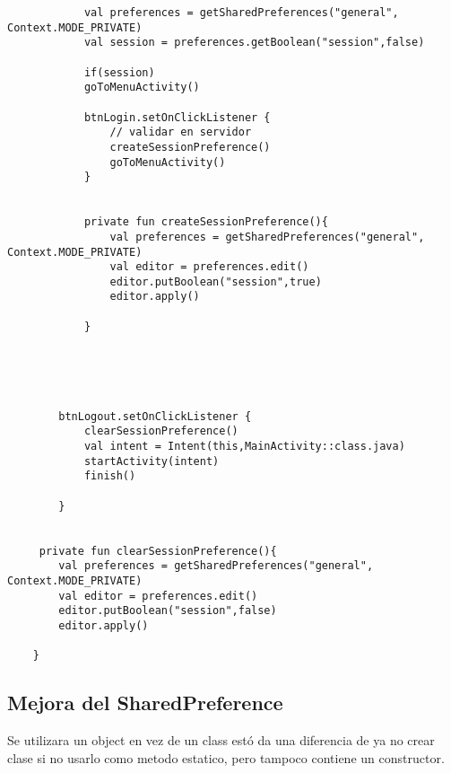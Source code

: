 \documentclass[a4paper]{article}
\begin{document}
		\begin{lstlisting}
			val preferences = getSharedPreferences("general", Context.MODE_PRIVATE)
			val session = preferences.getBoolean("session",false)
			
			if(session)
			goToMenuActivity()
			
			btnLogin.setOnClickListener {
				// validar en servidor
				createSessionPreference()
				goToMenuActivity()
			}
		
			
			private fun createSessionPreference(){
				val preferences = getSharedPreferences("general", Context.MODE_PRIVATE)
				val editor = preferences.edit()
				editor.putBoolean("session",true)
				editor.apply()
				
			}
		
		
		
		
		
		btnLogout.setOnClickListener {
			clearSessionPreference()
			val intent = Intent(this,MainActivity::class.java)
			startActivity(intent)
			finish()
			
		}
	
	
	 private fun clearSessionPreference(){
		val preferences = getSharedPreferences("general", Context.MODE_PRIVATE)
		val editor = preferences.edit()
		editor.putBoolean("session",false)
		editor.apply()
		
	}
		\end{lstlisting}
		
		
		\subsection{Mejora del SharedPreference}
		Se utilizara un object en vez de un class estó da una diferencia de ya no crear clase si no usarlo como metodo estatico, pero tampoco contiene un constructor.
		
\end{document}
